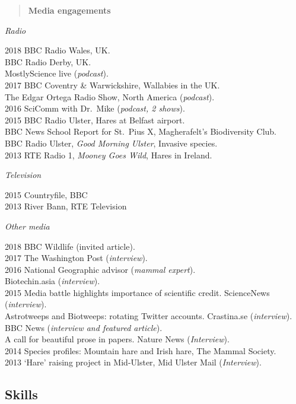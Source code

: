 \documentclass[]{article}
\begin{document}
\begin{quote}
\textbf{Media engagements}
\end{quote}

\emph{Radio}

2018 BBC Radio Wales, UK.\\
BBC Radio Derby, UK.\\
MostlyScience live (\emph{podcast}).\\
2017 BBC Coventry \& Warwickshire, Wallabies in the UK.\\
The Edgar Ortega Radio Show, North America (\emph{podcast}).\\
2016 SciComm with Dr.~Mike (\emph{podcast, 2 shows}).\\
2015 BBC Radio Ulster, Hares at Belfast airport.\\
BBC News School Report for St.~Pius X, Magherafelt's Biodiversity
Club.\\
BBC Radio Ulster, \emph{Good Morning Ulster}, Invasive species.\\
2013 RTE Radio 1, \emph{Mooney Goes Wild}, Hares in Ireland.

\emph{Television}

2015 Countryfile, BBC\\
2013 River Bann, RTE Television

\emph{Other media}

2018 BBC Wildlife (invited article).\\
2017 The Washington Post (\emph{interview}).\\
2016 National Geographic advisor (\emph{mammal expert}).\\
Biotechin.asia (\emph{interview}).\\
2015 Media battle highlights importance of scientific credit.
ScienceNews (\emph{interview}).\\
Astrotweeps and Biotweeps: rotating Twitter accounts. Crastina.se
(\emph{interview}).\\
BBC News (\emph{interview and featured article}).\\
A call for beautiful prose in papers. Nature News (\emph{Interview}).\\
2014 Species profiles: Mountain hare and Irish hare, The Mammal
Society.\\
2013 `Hare' raising project in Mid-Ulster, Mid Ulster Mail
(\emph{Interview}).

\subsection{Skills}\label{skills}
\end{document}
